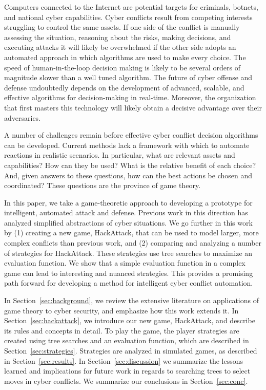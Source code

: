 Computers connected to the Internet are potential targets for criminals, botnets, and national cyber capabilities. Cyber conflicts result from competing interests struggling to control the same assets. If one side of the conflict is manually assessing the situation, reasoning about the risks, making decisions, and executing attacks it will likely be overwhelmed if the other side adopts an automated approach in which algorithms are used to make every choice. The speed of human-in-the-loop decision making is likely to be several orders of magnitude slower than a well tuned algorithm. The future of cyber offense and defense undoubtedly depends on the development of advanced, scalable, and effective algorithms for decision-making in real-time. Moreover, the organization that first masters this technology will likely obtain a decisive advantage over their adversaries. 

A number of challenges remain before effective cyber conflict decision algorithms can be developed. Current methods lack a framework with which to automate reactions in realistic scenarios. In particular, what are relevant assets and capabilities? How can they be used? What is the relative benefit of each choice? And, given answers to these questions, how can the best actions be chosen and coordinated? These questions are the province of game theory.

In this paper, we take a game-theoretic approach to developing a prototype for intelligent, automated attack and defense. Previous work in this direction has analyzed simplified abstractions of cyber situations. We go further in this work by (1) creating a new game, HackAttack, that can be used to model larger, more complex conflicts than previous work, and (2) comparing and analyzing a number of strategies for HackAttack. These strategies use tree searches to maximize an evaluation function. We show that a simple evaluation function in a complex game can lead to interesting and nuanced strategies. This provides a promising path forward for developing a method for intelligent cyber conflict automation.

In Section~\ref{sec:background}, we review the extensive literature on applications of game theory to cyber security, and emphasize how this work extends it. In Section~\ref{sec:hackattack}, we introduce our new game, HackAttack, and describe its rules and concepts in detail. To play the game, the player strategies are created using tree searches and an evaluation function, which are described in Section~\ref{sec:strategies}. Strategies are analyzed in simulated games, as described in Section~\ref{sec:results}. In Section~\ref{sec:discussion} we summarize the lessons learned and implications for future work in regards to searching trees to select moves in cyber conflicts. We summarize our conclusions in Section~\ref{sec:conc}.